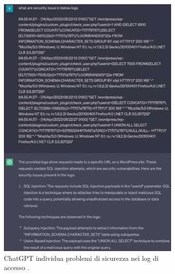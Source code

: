 \begin{figure}[ht]
	\centering
	\begin{subfigure}{0.3\textwidth}
		\includegraphics[width=1.0\textwidth]{Immagini/logs_detecting.png}
		\caption{ChatGPT individua problemi di sicurezza nei log di accesso \cite{calbimonte2023powershell}.}
            \label{fig:logs-detecting}
	\end{subfigure}%
	\begin{subfigure}{0.3\textwidth}

\end{subfigure}
\end{figure}
